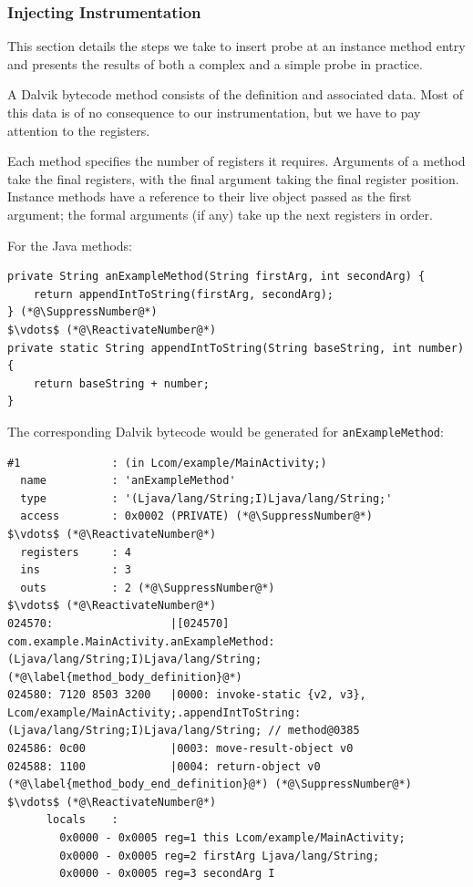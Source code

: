 \subsubsection{Injecting Instrumentation}

This section details the steps we take to insert probe at an instance method entry and presents the results of both a complex and a simple probe in practice.

A Dalvik bytecode method consists of the definition and associated data. Most of this data is of no consequence to our instrumentation, but we have to pay attention to the registers.

Each method specifies the number of registers it requires. Arguments of a method take the final registers, with the final argument taking the final register position. Instance methods have a reference to their live object passed as the first argument; the formal arguments (if any) take up the next registers in order.

For the Java methods:

\begin{lstlisting}[mathescape, numberblanklines=false]
private String anExampleMethod(String firstArg, int secondArg) {
    return appendIntToString(firstArg, secondArg);
} (*@\SuppressNumber@*)
$\vdots$ (*@\ReactivateNumber@*)
private static String appendIntToString(String baseString, int number) {
    return baseString + number;
}
\end{lstlisting}

The corresponding Dalvik bytecode would be generated for {\tt anExampleMethod}:

\begin{lstlisting}[mathescape,numberblanklines=false]
#1              : (in Lcom/example/MainActivity;)
  name          : 'anExampleMethod'
  type          : '(Ljava/lang/String;I)Ljava/lang/String;'
  access        : 0x0002 (PRIVATE) (*@\SuppressNumber@*)
$\vdots$ (*@\ReactivateNumber@*)
  registers     : 4
  ins           : 3
  outs          : 2 (*@\SuppressNumber@*)
$\vdots$ (*@\ReactivateNumber@*)
024570:                  |[024570] com.example.MainActivity.anExampleMethod:(Ljava/lang/String;I)Ljava/lang/String; (*@\label{method_body_definition}@*)
024580: 7120 8503 3200   |0000: invoke-static {v2, v3}, Lcom/example/MainActivity;.appendIntToString:(Ljava/lang/String;I)Ljava/lang/String; // method@0385
024586: 0c00             |0003: move-result-object v0
024588: 1100             |0004: return-object v0 (*@\label{method_body_end_definition}@*) (*@\SuppressNumber@*)
$\vdots$ (*@\ReactivateNumber@*)
      locals    :
        0x0000 - 0x0005 reg=1 this Lcom/example/MainActivity;
        0x0000 - 0x0005 reg=2 firstArg Ljava/lang/String;
        0x0000 - 0x0005 reg=3 secondArg I
\end{lstlisting}

